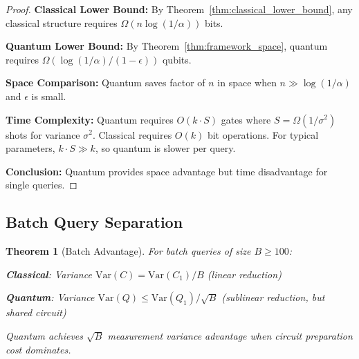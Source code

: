 \documentclass[11pt,letterpaper]{article}
\newtheorem{theorem}{Theorem}
\begin{document}
\begin{proof}
\textbf{Classical Lower Bound:} By Theorem~\ref{thm:classical_lower_bound}, any classical structure requires $\Omega(n \log(1/\alpha))$ bits.

\textbf{Quantum Lower Bound:} By Theorem~\ref{thm:framework_space}, quantum requires $\Omega(\log(1/\alpha)/(1-\epsilon))$ qubits.

\textbf{Space Comparison:} Quantum saves factor of $n$ in space when $n \gg \log(1/\alpha)$ and $\epsilon$ is small.

\textbf{Time Complexity:} Quantum requires $O(k \cdot S)$ gates where $S = \Omega(1/\sigma^2)$ shots for variance $\sigma^2$. Classical requires $O(k)$ bit operations. For typical parameters, $k \cdot S \gg k$, so quantum is slower per query.

\textbf{Conclusion:} Quantum provides space advantage but time disadvantage for single queries.
\end{proof}

\subsection{Batch Query Separation}

\begin{theorem}[Batch Advantage]
\label{thm:batch_advantage}
For batch queries of size $B \geq 100$:

\textbf{Classical}: Variance $\text{Var}(C) = \text{Var}(C_1)/B$ (linear reduction)

\textbf{Quantum}: Variance $\text{Var}(Q) \leq \text{Var}(Q_1)/\sqrt{B}$ (sublinear reduction, but shared circuit)

Quantum achieves $\sqrt{B}$ measurement variance advantage when circuit preparation cost dominates.
\end{theorem}
\end{document}
